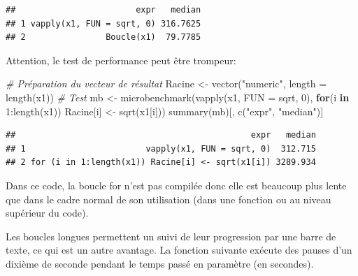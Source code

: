 \documentclass[
  11pt,
  french,
  a4paper,
  extrafontsizes,onecolumn,openright
  ]{memoir}
\newenvironment{Shaded}{\begin{snugshade}}{\end{snugshade}}
\newcommand{\AttributeTok}[1]{\textcolor[rgb]{0.77,0.63,0.00}{#1}}
\newcommand{\CommentTok}[1]{\textcolor[rgb]{0.56,0.35,0.01}{\textit{#1}}}
\newcommand{\ControlFlowTok}[1]{\textcolor[rgb]{0.13,0.29,0.53}{\textbf{#1}}}
\newcommand{\DecValTok}[1]{\textcolor[rgb]{0.00,0.00,0.81}{#1}}
\newcommand{\FunctionTok}[1]{\textcolor[rgb]{0.00,0.00,0.00}{#1}}
\newcommand{\NormalTok}[1]{#1}
\newcommand{\OtherTok}[1]{\textcolor[rgb]{0.56,0.35,0.01}{#1}}
\newcommand{\SpecialCharTok}[1]{\textcolor[rgb]{0.00,0.00,0.00}{#1}}
\newcommand{\StringTok}[1]{\textcolor[rgb]{0.31,0.60,0.02}{#1}}
\begin{document}
\begin{verbatim}
##                        expr   median
## 1 vapply(x1, FUN = sqrt, 0) 316.7625
## 2                Boucle(x1)  79.7785
\end{verbatim}

\normalsize

Attention, le test de performance peut être trompeur:

\scriptsize

\begin{Shaded}
\begin{Highlighting}[]
\CommentTok{\# Préparation du vecteur de résultat}
\NormalTok{Racine }\OtherTok{\textless{}{-}} \FunctionTok{vector}\NormalTok{(}\StringTok{"numeric"}\NormalTok{, }\AttributeTok{length =} \FunctionTok{length}\NormalTok{(x1))}
\CommentTok{\# Test}
\NormalTok{mb }\OtherTok{\textless{}{-}} \FunctionTok{microbenchmark}\NormalTok{(}\FunctionTok{vapply}\NormalTok{(x1, }\AttributeTok{FUN =}\NormalTok{ sqrt, }\DecValTok{0}\NormalTok{), }
                     \ControlFlowTok{for}\NormalTok{(i }\ControlFlowTok{in} \DecValTok{1}\SpecialCharTok{:}\FunctionTok{length}\NormalTok{(x1)) }
\NormalTok{                       Racine[i] }\OtherTok{\textless{}{-}} \FunctionTok{sqrt}\NormalTok{(x1[i]))}
\FunctionTok{summary}\NormalTok{(mb)[, }\FunctionTok{c}\NormalTok{(}\StringTok{"expr"}\NormalTok{, }\StringTok{"median"}\NormalTok{)]}
\end{Highlighting}
\end{Shaded}

\begin{verbatim}
##                                               expr   median
## 1                        vapply(x1, FUN = sqrt, 0)  312.715
## 2 for (i in 1:length(x1)) Racine[i] <- sqrt(x1[i]) 3289.934
\end{verbatim}

\normalsize

Dans ce code, la boucle for n'est pas compilée donc elle est beaucoup plus lente que dans le cadre normal de son utilisation (dans une fonction ou au niveau supérieur du code).

Les boucles longues permettent un suivi de leur progression par une barre de texte, ce qui est un autre avantage.
La fonction suivante exécute des pauses d'un dixième de seconde pendant le temps passé en paramètre (en secondes).

\scriptsize
\end{document}
